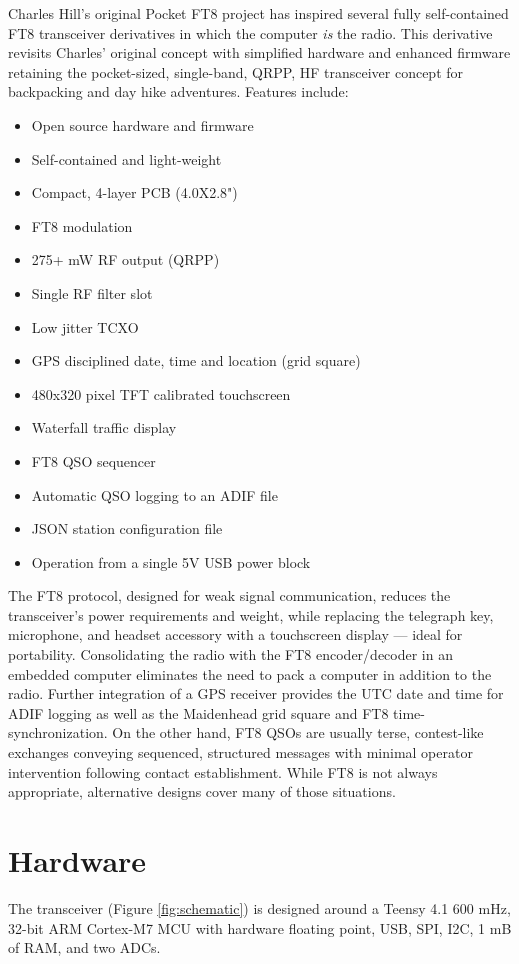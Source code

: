 \documentclass[12pt, letterpaper]{article}
\begin{document}
Charles Hill's original Pocket FT8 project\cite{pocketFT8} has inspired several\cite{dxFT8}\cite{tinyDX} fully self-contained FT8 transceiver derivatives in which the computer \textit{is} the radio.
This derivative revisits Charles' original concept with simplified hardware and enhanced firmware retaining the pocket-sized, single-band, QRPP, HF transceiver concept for backpacking and day hike adventures. 
Features include:
  \begin{itemize} [noitemsep]
  \item Open source hardware and firmware
  \item Self-contained and light-weight
  \item Compact, 4-layer PCB (4.0X2.8")
  \item FT8 modulation
  \item 275+ mW RF output (QRPP)
  \item Single RF filter slot
  \item Low jitter TCXO
  \item GPS disciplined date, time and location (grid square)
  \item 480x320 pixel TFT calibrated touchscreen
  \item Waterfall traffic display
  \item FT8 QSO sequencer
  \item Automatic QSO logging to an  ADIF file
  \item JSON station configuration file
  \item Operation from a single 5V USB power block
  \end{itemize}
The FT8 protocol\cite{qexFT8}, designed for weak signal communication,  reduces the transceiver's power requirements and weight, while replacing the telegraph key, microphone, and headset accessory with a touchscreen display --- ideal for portability.
Consolidating the  radio with the FT8 encoder/decoder in an embedded computer eliminates the need to pack a computer in  addition to the radio.
Further integration of a GPS receiver provides the UTC date and time for ADIF logging as well as the Maidenhead grid square and FT8 time-synchronization.
On the other hand, FT8 QSOs are usually terse, contest-like exchanges conveying sequenced,  structured messages with minimal operator intervention following  contact establishment.
While FT8 is not always appropriate, alternative designs\cite{kh1}\cite{qmx}  cover many of those situations.
  
 \section{Hardware}
The transceiver (Figure \ref{fig:schematic}) is designed around a Teensy 4.1 600 mHz, 32-bit ARM Cortex-M7 MCU with hardware floating point, USB, SPI, I2C, 1 mB of RAM, and two ADCs.
\end{document}
